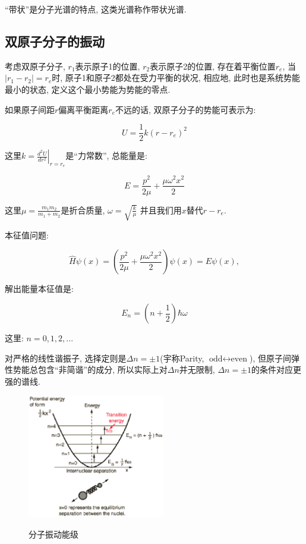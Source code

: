 ``带状''是分子光谱的特点, 这类光谱称作带状光谱.

\subsection{双原子分子的振动}

考虑双原子分子, $r_1$表示原子1的位置, $r_2$表示原子2的位置,
存在着平衡位置$r_e$, 当$|r_1 - r_2| = r_e$时,
原子1和原子2都处在受力平衡的状况, 相应地,
此时也是系统势能最小的状态, 定义这个最小势能为势能的零点.

如果原子间距$r$偏离平衡距离$r_e$不远的话, 双原子分子的势能可表示为:

\begin{equation*}
    U= \frac{1}{2}k(r-r_e)^2
\end{equation*}

这里$k=\left. \frac{d^2 U}{d r^2}\right|_{r=r_e}$是``力常数'',
总能量是:


\begin{equation}\label{energy for harmonic oscillator}
E = \frac{p^2}{2\mu} + \frac{\mu \omega^2 x^2}{2}
\end{equation}

这里$\mu=\frac{m_1m_2}{m_1 +m_2}$是折合质量, $\omega =
\sqrt{\frac{k}{\mu}}$ 并且我们用$x$替代$r-r_e$.


本征值问题:

\begin{equation*}
   \hat H\psi(x) =\left( \frac{p^2}{2\mu} + \frac{\mu \omega^2 x^2}{2} \right) \psi(x)=
   E\psi(x),
\end{equation*}

解出能量本征值是:

\begin{equation*}
E_n = \left(n + \frac{1}{2}\right)\hbar \omega
\end{equation*}

这里: $n=0, 1, 2, ...$

对严格的线性谐振子, 选择定则是$\Delta n = \pm 1$(宇称Parity,
$\text{odd} \leftrightarrow \text{even}$),
但原子间弹性势能总包含``非简谐''的成分, 所以实际上对$\Delta
n$并无限制, $\Delta n = \pm 1$的条件对应更强的谱线.

\begin{figure}[h]
\begin{center}
  \includegraphics[width=6cm]{Spectrum/atoms-vibration.ps}\\
  \caption{分子振动能级}\label{energy levels for di-molecule}
\end{center}
\end{figure}

